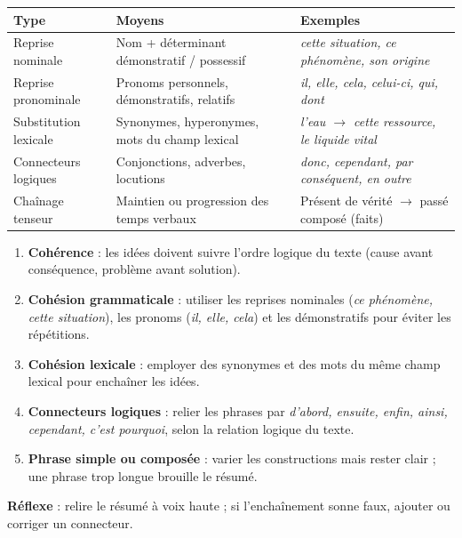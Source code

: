 \documentclass[11pt]{article}
\begin{document}
\begin{propriete}
\begin{center}
\begin{tabularx}{\linewidth}{|l|X|X|}\hline
\textbf{Type} & \textbf{Moyens} & \textbf{Exemples} \\ \hline
Reprise nominale & Nom + déterminant démonstratif / possessif & \emph{cette situation, ce phénomène, son origine} \\ \hline
Reprise pronominale & Pronoms personnels, démonstratifs, relatifs & \emph{il, elle, cela, celui-ci, qui, dont} \\ \hline
Substitution lexicale & Synonymes, hyperonymes, mots du champ lexical & \emph{l'eau $\rightarrow$ cette ressource, le liquide vital} \\ \hline
Connecteurs logiques & Conjonctions, adverbes, locutions & \emph{donc, cependant, par conséquent, en outre} \\ \hline
Chaînage tenseur & Maintien ou progression des temps verbaux & Présent de vérité $\rightarrow$ passé composé (faits) \\ \hline
\end{tabularx}
\end{center}
\end{propriete}

\begin{methode}
\begin{enumerate}
\item \textbf{Cohérence} : les idées doivent suivre l'ordre logique du texte (cause avant conséquence, problème avant solution).
\item \textbf{Cohésion grammaticale} : utiliser les reprises nominales (\emph{ce phénomène, cette situation}), les pronoms (\emph{il, elle, cela}) et les démonstratifs pour éviter les répétitions.
\item \textbf{Cohésion lexicale} : employer des synonymes et des mots du même champ lexical pour enchaîner les idées.
\item \textbf{Connecteurs logiques} : relier les phrases par \emph{d'abord, ensuite, enfin, ainsi, cependant, c'est pourquoi}, selon la relation logique du texte.
\item \textbf{Phrase simple ou composée} : varier les constructions mais rester clair ; une phrase trop longue brouille le résumé.
\end{enumerate}
\textbf{Réflexe} : relire le résumé à voix haute ; si l'enchaînement sonne faux, ajouter ou corriger un connecteur.
\end{methode}
\end{document}
